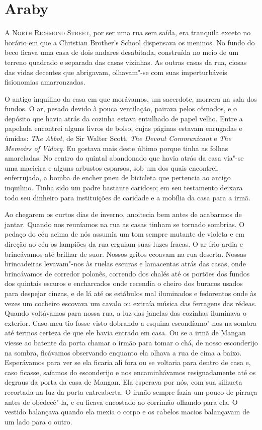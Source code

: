 \chapter{Araby}

\textsc{A North Richmond Street,} por ser uma rua sem saída, era tranquila
exceto no horário em que a Christian Brother’s School dispensava os meninos.
No fundo do beco ficava uma casa de dois andares desabitada, construída no meio
de um terreno quadrado e separada das casas vizinhas.  As outras casas da rua,
ciosas das vidas decentes que abrigavam, olhavam"-se com suas imperturbáveis
fisionomias amarronzadas.

O antigo inquilino da casa em que morávamos, um sacerdote, morrera na sala dos
fundos.  O ar, pesado devido à pouca ventilação, pairava pelos cômodos, e o
depósito que havia atrás da cozinha estava entulhado de papel velho.  Entre a
papelada encontrei alguns livros de bolso, cujas páginas estavam enrugadas e
úmidas: \textit{The Abbot}, de Sir Walter Scott, \textit{The Devout
Communicant} e \textit{The Memoirs of Vidocq}.  Eu gostava mais deste último
porque tinha as folhas amareladas.  No centro do quintal abandonado que havia
atrás da casa via"-se uma macieira e alguns arbustos esparsos, sob um dos quais
encontrei, enferrujada, a bomba de encher pneu de bicicleta que pertencia ao
antigo inquilino.  Tinha sido um padre bastante caridoso; em seu testamento
deixara todo seu dinheiro para instituições de caridade e a mobília da casa
para a irmã.

Ao chegarem os curtos dias de inverno, anoitecia bem antes de acabarmos de
jantar.  Quando nos reuníamos na rua as casas tinham se tornado sombrias.  O
pedaço do céu acima de nós assumia um tom sempre mutante de violeta e em
direção ao céu os lampiões da rua erguiam suas luzes fracas.  O ar frio ardia e
brincávamos até brilhar de suor.  Nossos gritos ecoavam na rua deserta.  Nossas
brincadeiras levavam"-nos às ruelas escuras e lamacentas atrás das casas, onde
brincávamos de corredor polonês, correndo dos chalés até os portões dos fundos
dos quintais escuros e encharcados onde recendia o cheiro dos buracos usados
para despejar cinzas, e de lá até os estábulos mal iluminados e fedorentos onde
às vezes um cocheiro escovava um cavalo ou extraía música das ferragens das
rédeas.  Quando voltávamos para nossa rua, a luz das janelas das cozinhas
iluminava o exterior.  Caso meu tio fosse visto dobrando a esquina
escondíamo"-nos na sombra até termos certeza de que ele havia entrado em casa.
Ou se a irmã de Mangan viesse ao batente da porta chamar o irmão para tomar o
chá, de nosso esconderijo na sombra, ficávamos observando enquanto ela olhava a
rua de cima a baixo.  Esperávamos para ver se ela ficaria ali fora ou se
voltaria para dentro de casa e, caso ficasse, saíamos do esconderijo e nos
encaminhávamos resignadamente até os degraus da porta da casa de Mangan.  Ela
esperava por nós, com sua silhueta recortada na luz da porta entreaberta.  O
irmão sempre fazia um pouco de pirraça antes de obedecê"-la, e eu ficava
encostado ao corrimão olhando para ela.  O vestido balançava quando ela mexia o
corpo e os cabelos macios balançavam de um lado para o outro.

